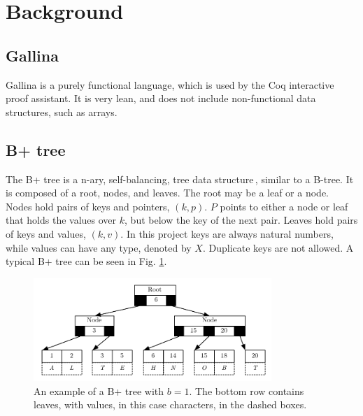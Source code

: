 \section{Background}
\label{sec:Background}

\subsection{Gallina}
Gallina is a purely functional language, which is used by the Coq interactive proof assistant. It is very lean, and does not include non-functional data structures, such as arrays.

\subsection{B+ tree}
\label{subsec:Background_Bplus_tree}
The B+ tree is a n-ary, self-balancing, tree data structure\,\cite[pp. 334]{ramakrishnan2003database}, similar to a B-tree. It is composed of a root, nodes, and leaves. The root may be a leaf or a node. Nodes hold pairs of keys and pointers, $(k, p)$. $P$ points to either a node or leaf that holds the values over $k$, but below the key of the next pair. Leaves hold pairs of keys and values, $(k, v)$. In this project keys are always natural numbers, while values can have any type, denoted by $X$. Duplicate keys are not allowed. A typical B+ tree can be seen in Fig. \ref{fig:bplustree}.

\begin{figure}
 \centering
   \includegraphics[width=90mm]{diagrams/BPlusTree.pdf}
 \caption{An example of a B+ tree with $b=1$. The bottom row contains leaves, with values, in this case characters, in the dashed boxes.}
 \label{fig:bplustree}
\end{figure}

